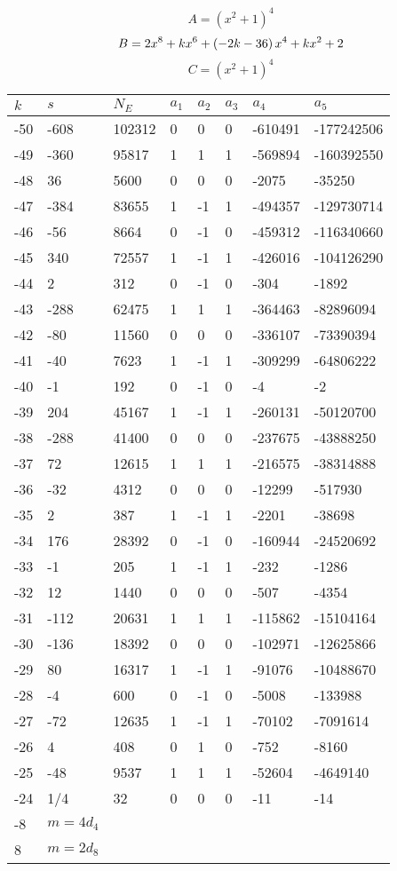 \documentclass{amsart}
\begin{document}
$$A=(x^2
 + 1)^{4}$$
$$B=2\*x^8
 + k\*x^6
 + \left(-2\*k
 - 36\right) \*x^4
 + k\*x^2
 + 2$$
$$C=(x^2
 + 1)^{4}$$
\begin{longtable}{|l|l|l|lllll|}
\hline
$k$ & $s$ & $N_E$ & $a_1$ & $a_2$ & $a_3$ & $a_4$ & $a_5$\\
\hline
-50&-608&102312&0&0&0&-610491&-177242506\\
-49&-360&95817&1&1&1&-569894&-160392550\\
-48&36&5600&0&0&0&-2075&-35250\\
-47&-384&83655&1&-1&1&-494357&-129730714\\
-46&-56&8664&0&-1&0&-459312&-116340660\\
-45&340&72557&1&-1&1&-426016&-104126290\\
-44&2&312&0&-1&0&-304&-1892\\
-43&-288&62475&1&1&1&-364463&-82896094\\
-42&-80&11560&0&0&0&-336107&-73390394\\
-41&-40&7623&1&-1&1&-309299&-64806222\\
-40&-1&192&0&-1&0&-4&-2\\
-39&204&45167&1&-1&1&-260131&-50120700\\
-38&-288&41400&0&0&0&-237675&-43888250\\
-37&72&12615&1&1&1&-216575&-38314888\\
-36&-32&4312&0&0&0&-12299&-517930\\
-35&2&387&1&-1&1&-2201&-38698\\
-34&176&28392&0&-1&0&-160944&-24520692\\
-33&-1&205&1&-1&1&-232&-1286\\
-32&12&1440&0&0&0&-507&-4354\\
-31&-112&20631&1&1&1&-115862&-15104164\\
-30&-136&18392&0&0&0&-102971&-12625866\\
-29&80&16317&1&-1&1&-91076&-10488670\\
-28&-4&600&0&-1&0&-5008&-133988\\
-27&-72&12635&1&-1&1&-70102&-7091614\\
-26&4&408&0&1&0&-752&-8160\\
-25&-48&9537&1&1&1&-52604&-4649140\\
-24&1/4&32&0&0&0&-11&-14\\
-8&$m=4d_{4}$&&\multicolumn{5}{c|}{}\\
8&$m=2d_{8}$&&\multicolumn{5}{c|}{}\\
\hline
\end{longtable}
\end{document}
